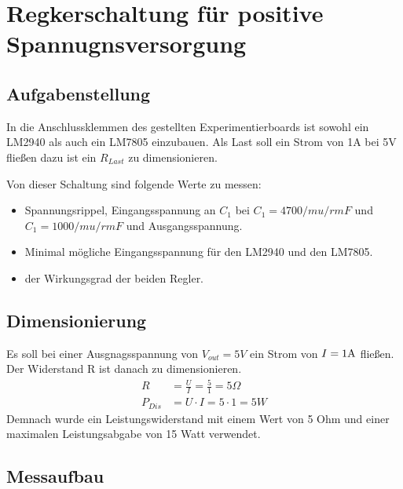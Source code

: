 \section{Regkerschaltung für positive Spannugnsversorgung}
\subsection{Aufgabenstellung}
In die Anschlussklemmen des gestellten Experimentierboards ist sowohl ein LM2940 als auch ein LM7805 einzubauen. Als Last soll ein Strom von 1A bei 5V fließen dazu ist ein $R_{Last}$ zu dimensionieren. 

Von dieser Schaltung sind folgende Werte zu messen:
\begin{itemize}
    \item Spannungsrippel, Eingangsspannung an $C_1$ bei $C_1=4700/mu /rm F$ und $C_1=1000/mu /rm F$ und Ausgangsspannung.
    \item Minimal mögliche Eingangsspannung für den LM2940 und den LM7805.
    \item der Wirkungsgrad der beiden Regler.
\end{itemize}
\subsection{Dimensionierung}
Es soll bei einer Ausgnagsspannung von $V_{out} = 5V$ ein Strom von $I=1\rm A$ fließen. Der Widerstand R ist danach zu dimensionieren.
\begin{align}
    R&= \frac{U}{I} = \frac{5}{1} = 5\Omega \\
    P_{Dis} &= U \cdot I = 5\cdot 1 = 5 W
\end{align}
Demnach wurde ein Leistungswiderstand mit einem Wert von 5 Ohm und einer maximalen Leistungsabgabe von 15 Watt verwendet.
\subsection{Messaufbau}

